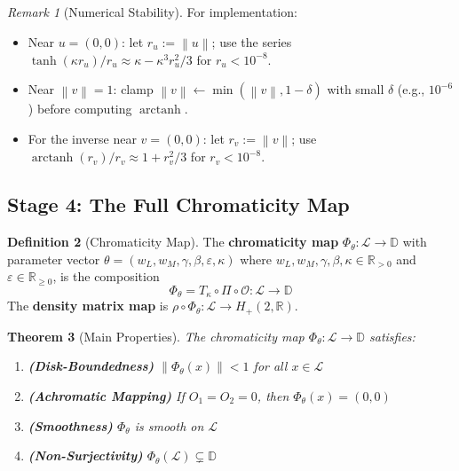 \documentclass[11pt]{article}
\theoremstyle{plain}
\newtheorem{theorem}{Theorem}[section]
\theoremstyle{definition}
\newtheorem{definition}[theorem]{Definition}
\theoremstyle{remark}
\newtheorem{remark}[theorem]{Remark}
\newcommand{\R}{\mathbb{R}}
\newcommand{\Rnn}{\mathbb{R}_{\geq 0}}  %
\newcommand{\Rpp}{\mathbb{R}_{> 0}}     %
\newcommand{\D}{\mathbb{D}}
\newcommand{\norm}[1]{\left\lVert #1 \right\rVert}
\DeclareMathOperator{\arctanh}{arctanh}
\begin{document}
\begin{remark}[Numerical Stability]
\label{rem:numerical}
For implementation:
\begin{itemize}
    \item Near $u = (0,0)$: let $r_u := \norm{u}$; use the series $\tanh(\kappa r_u)/r_u \approx \kappa - \kappa^3 r_u^2/3$ for $r_u < 10^{-8}$.
    \item Near $\norm{v} = 1$: clamp $\norm{v} \leftarrow \min(\norm{v}, 1 - \delta)$ with small $\delta$ (e.g., $10^{-6}$) before computing $\arctanh$.
    \item For the inverse near $v = (0,0)$: let $r_v := \norm{v}$; use $\arctanh(r_v)/r_v \approx 1 + r_v^2/3$ for $r_v < 10^{-8}$.
\end{itemize}
\end{remark}

\subsection{Stage 4: The Full Chromaticity Map}

\begin{definition}[Chromaticity Map]
\label{def:full-map}
The \textbf{chromaticity map} $\Phi_\theta: \mathcal{L} \to \D$ with parameter vector $\theta = (w_L, w_M, \gamma, \beta, \varepsilon, \kappa)$ where $w_L, w_M, \gamma, \beta, \kappa \in \Rpp$ and $\varepsilon \in \Rnn$, is the composition
\begin{equation}
\boxed{
\Phi_\theta = T_\kappa \circ \Pi \circ \mathcal{O}: \mathcal{L} \to \D
}
\end{equation}
The \textbf{density matrix map} is $\rho \circ \Phi_\theta: \mathcal{L} \to H_+(2,\R)$.
\end{definition}

\begin{theorem}[Main Properties]
\label{thm:main-props}
The chromaticity map $\Phi_\theta: \mathcal{L} \to \D$ satisfies:
\begin{enumerate}[label=(\roman*)]
    \item \textbf{(Disk-Boundedness)} $\norm{\Phi_\theta(x)} < 1$ for all $x \in \mathcal{L}$
    \item \textbf{(Achromatic Mapping)} If $O_1 = O_2 = 0$, then $\Phi_\theta(x) = (0,0)$
    \item \textbf{(Smoothness)} $\Phi_\theta$ is smooth on $\mathcal{L}$
    \item \textbf{(Non-Surjectivity)} $\Phi_\theta(\mathcal{L}) \subsetneq \D$
\end{enumerate}
\end{theorem}
\end{document}
